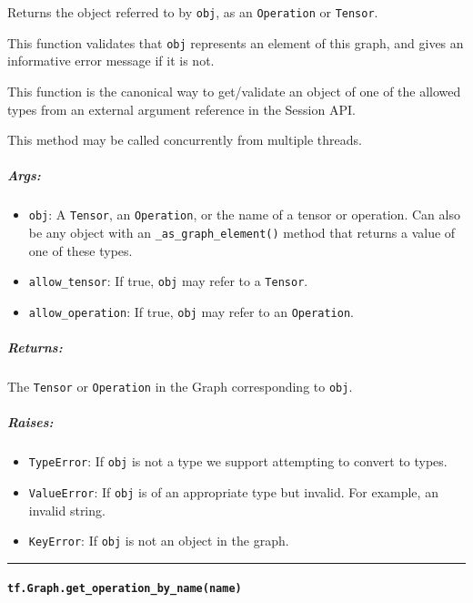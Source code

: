 Returns the object referred to by \lstinline{obj}, as an \lstinline{Operation}
or \lstinline{Tensor}.

This function validates that \lstinline{obj} represents an element of this
graph, and gives an informative error message if it is not.

This function is the canonical way to get/validate an object of one of
the allowed types from an external argument reference in the Session
API.

This method may be called concurrently from multiple threads.

\subparagraph{Args: }\label{args-6}

\begin{itemize}
\tightlist
\item
  \lstinline{obj}: A \lstinline{Tensor}, an \lstinline{Operation}, or the name of
  a tensor or operation. Can also be any object with an
  \lstinline{_as_graph_element()} method that returns a value of one of
  these types.
\item
  \lstinline{allow_tensor}: If true, \lstinline{obj} may refer to a
  \lstinline{Tensor}.
\item
  \lstinline{allow_operation}: If true, \lstinline{obj} may refer to an
  \lstinline{Operation}.
\end{itemize}

\subparagraph{Returns: }\label{returns-6}

The \lstinline{Tensor} or \lstinline{Operation} in the Graph corresponding to
\lstinline{obj}.

\subparagraph{Raises: }\label{raises-1}

\begin{itemize}
\tightlist
\item
  \lstinline{TypeError}: If \lstinline{obj} is not a type we support
  attempting to convert to types.
\item
  \lstinline{ValueError}: If \lstinline{obj} is of an appropriate type but
  invalid. For example, an invalid string.
\item
  \lstinline{KeyError}: If \lstinline{obj} is not an object in the graph.
\end{itemize}

\begin{center}\rule{0.5\linewidth}{\linethickness}\end{center}

\paragraph{\texorpdfstring{\lstinline{tf.Graph.get_operation_by_name(name)}
}{tf.Graph.get_operation_by_name(name) }}\label{tf.graph.getux5foperationux5fbyux5fnamename}

